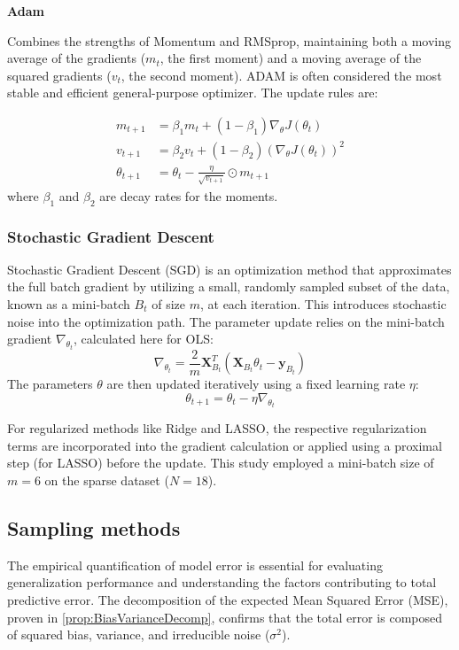 \documentclass[twocolumn,aps]{revtex4}
\begin{document}
\textbf{Adam}

Combines the strengths of Momentum and RMSprop, maintaining both a moving average of the gradients ($m_t$, the first moment) and a moving average of the squared gradients ($v_t$, the second moment). 
ADAM is often considered the most stable and efficient general-purpose optimizer. 
The update rules are:

\begin{align*}
m_{t+1} &= \beta_1 m_t + (1 - \beta_1) \nabla_{\theta} J(\theta_t) \\
v_{t+1} &= \beta_2 v_t + (1 - \beta_2) (\nabla_{\theta} J(\theta_t))^2 \\
\theta_{t+1} &= \theta_t - \frac{\eta}{\sqrt{v_{t+1}}} \odot m_{t+1}
\end{align*}
where $\beta_1$ and $\beta_2$ are decay rates for the moments.

\subsubsection{Stochastic Gradient Descent}
Stochastic Gradient Descent (SGD) is an optimization method that approximates the full batch gradient by utilizing a small, randomly sampled subset of the data, known as a mini-batch $B_t$ of size $m$, at each iteration. This introduces stochastic noise into the optimization path. 
The parameter update relies on the mini-batch gradient $\nabla_{\theta_t}$, calculated here for OLS:
$$\nabla_{\theta_{t}}=\frac{2}{m}\mathbf{X}_{B_{t}}^{T}(\mathbf{X}_{B_{t}}\theta_{t}-\mathbf{y}_{B_{t}})$$
The parameters $\theta$ are then updated iteratively using a fixed learning rate $\eta$:
$$\theta_{t+1}=\theta_{t}-\eta\nabla_{\theta_{t}}$$

For regularized methods like Ridge and LASSO, the respective regularization terms are incorporated into the gradient calculation or applied using a proximal step (for LASSO) before the update. This study employed a mini-batch size of $m=6$ on the sparse dataset ($N=18$).

\subsection{Sampling methods}
The empirical quantification of model error is essential for evaluating generalization performance and understanding the factors contributing to total predictive error. The decomposition of the expected Mean Squared Error (MSE), proven in \ref{prop:BiasVarianceDecomp}, confirms that the total error is composed of squared bias, variance, and irreducible noise ($\sigma^2$).
\end{document}
